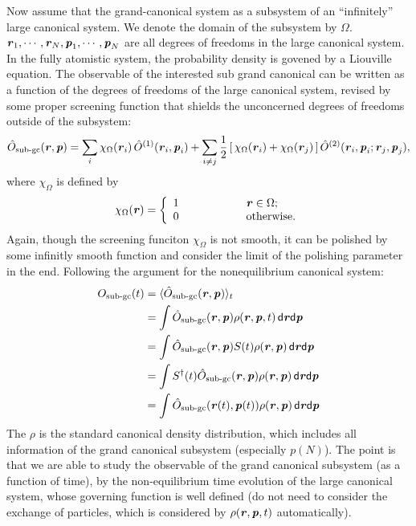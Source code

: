 \documentclass[aps,pre,preprint,unsortedaddress]{revtex4}
\renewcommand{\v}[1]{\textbf{\textit{#1}}}
\renewcommand{\d}[1]{\textsf{#1}}
\begin{document}
Now assume that the grand-canonical system as a subsystem of an
``infinitely'' large canonical system. We denote the domain of the
subsystem by $\Omega$. $\v r_1, \cdots, \v r_N, \v p_1, \cdots, \v
p_N$ are all degrees of freedoms in the large canonical system. In the fully atomistic system, the
probability density is govened by a Liouville equation.  The
observable of the interested sub grand canonical can be written as a
function of the degrees of freedoms of the large canonical system,
revised by some proper screening function that shields the unconcerned
degrees of freedoms outside of the subsystem:
\begin{align}
  \hat O_{\textrm{sub-gc}}(\v r, \v p) =
  \sum_i
  \chi_\Omega(\v r_i)\,\hat O^{(1)}(\v r_i, \v p_i) +
  \sum_{i\neq j}
  \frac12 \,[\,
  \chi_\Omega(\v r_i) + \chi_\Omega(\v r_j)
  \,]\,
  \hat O^{(2)}(\v r_i, \v p_i; \v r_j, \v p_j),  
\end{align}
where $\chi_\Omega$ is defined by
\begin{align}
  \chi_\Omega(\v r)=
  \left\{
    \begin{array}{lcl}
      1 &\qquad\qquad& \v r \in \Omega; \\
      0 && \textrm{otherwise}.
    \end{array}
  \right.
\end{align}
Again, though the screening funciton $\chi_\Omega$ is not smooth, it
can be polished by some infinitly smooth function and consider the
limit of the polishing parameter in the end.  Following the argument
for the nonequilibrium canonical system:
\begin{align}\nonumber
  O_{\textrm{sub-gc}}(t)
  & = \langle \hat O_{\textrm{sub-gc}}(\v r, \v p)\rangle_t\\\nonumber
  & =
  \int
  \hat O_{\textrm{sub-gc}}(\v r, \v p) \rho(\v r, \v p, t)\,
  \d d\v r\d d\v p\\\nonumber
  & =
  \int
  \hat O_{\textrm{sub-gc}}(\v r, \v p) S(t)\rho(\v r, \v p)\,
  \d d\v r\d d\v p\\\nonumber
  & =
  \int
  S^{\dagger}(t)\hat O_{\textrm{sub-gc}}(\v r, \v p) \rho(\v r, \v p)\,
  \d d\v r\d d\v p\\
  & =
  \int
  \hat O_{\textrm{sub-gc}}(\v r(t), \v p(t)) \rho(\v r, \v p)\,
  \d d\v r\d d\v p
\end{align}
The $\rho$ is the standard canonical density distribution, which
includes all information of the grand canonical subsystem (especially
$p(N)$). The point is that we are able to study the observable of the
grand canonical subsystem (as a function of time), by the
non-equilibrium time evolution of the large canonical system, whose
governing function is well defined (do not need to consider the
exchange of particles, which is considered by $\rho(\v r, \v p, t)$
automatically).





{}

\end{document}
